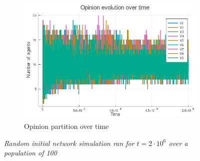 \documentclass[12pt,openright,twoside]{book}
\begin{document}
\begin{appendices}
\begin{figure}[!htb]
\begin{subfigure}[b]{0.65\linewidth}
    \includegraphics[width=\linewidth]{figures/2_2_er/vote_evolution.png}
    \caption{Opinion partition over time}
\end{subfigure}
\caption{\textit{{\small Random initial network simulation ran for $t=2\cdot 10^6$ over a population of 100}}}
\label{2_2_er}
\end{figure}


\end{appendices}
\end{document}
